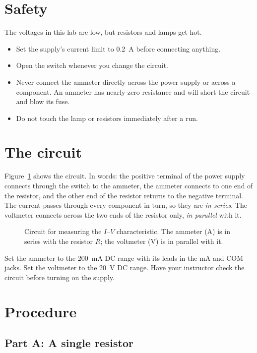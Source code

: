 \documentclass[11pt]{article}
\begin{document}
\section{Safety}

The voltages in this lab are low, but resistors and lamps get hot.
\begin{itemize}
  \item Set the supply's current limit to \SI{0.2}{\ampere} before connecting anything.
  \item Open the switch whenever you change the circuit.
  \item Never connect the ammeter directly across the power supply or across a component. An ammeter has nearly zero resistance and will short the circuit and blow its fuse.
  \item Do not touch the lamp or resistors immediately after a run.
\end{itemize}

\section{The circuit}

Figure~\ref{fig:circuit} shows the circuit. In words: the positive terminal of the power supply connects through the switch to the ammeter, the ammeter connects to one end of the resistor, and the other end of the resistor returns to the negative terminal. The current passes through every component in turn, so they are \emph{in series}. The voltmeter connects across the two ends of the resistor only, \emph{in parallel} with it.

\begin{figure}[H]
  \centering
  
  \caption{Circuit for measuring the $I$--$V$ characteristic. The ammeter (A) is in series with the resistor $R$; the voltmeter (V) is in parallel with it.}
  \label{fig:circuit}
\end{figure}

Set the ammeter to the \SI{200}{\milli\ampere} DC range with its leads in the \si{\milli\ampere} and COM jacks. Set the voltmeter to the \SI{20}{\volt} DC range. Have your instructor check the circuit before turning on the supply.

\section{Procedure}

\subsection*{Part A: A single resistor}
\end{document}
